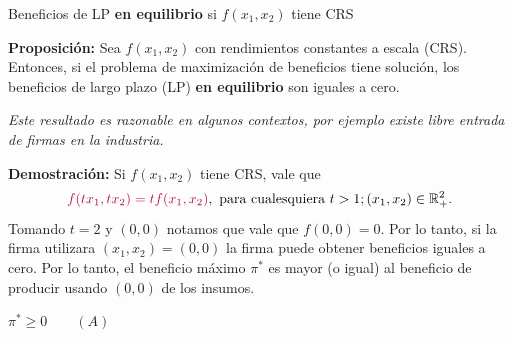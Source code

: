 \documentclass{beamer}
\theoremstyle{definition}
\begin{document}
\begin{frame}{ Beneficios de LP \textbf{en equilibrio} si $f(x_1,x_2)$ tiene CRS}

\color{cyan}\textbf{Proposición:} \color{black} Sea $f(x_1,x_2)$ con rendimientos constantes a escala (CRS). Entonces, si el problema de maximización de beneficios tiene soluci\'on, los beneficios de largo plazo (LP) \textbf{en equilibrio} son iguales a cero.

\textit{Este resultado es razonable en algunos contextos, por ejemplo existe libre entrada de firmas en la industria. }
\medskip

\color{cyan}\textbf{Demostración:} \color{black} Si $f\left( x_1,x_2\right) $ tiene CRS, vale que  \[\color{rosee}f(tx_1,tx_2)=tf(x_1,x_2)\color{black}, \text{ para cualesquiera } t>1; (x_1,x_2)\in \mathbb{R}_{+}^2.\] 
Tomando $t=2$ y $(0,0)$ notamos que vale que $f(0,0)=0$.  Por lo tanto, si la firma utilizara $(x_1,x_2)=(0,0)$ la firma puede obtener beneficios iguales a cero. Por lo tanto, el beneficio máximo $\pi^*$ es mayor (o igual) al beneficio de producir usando $(0,0)$ de los insumos. 
\begin{center}
$\pi ^{\ast }\geq 0 \qquad (A)$
\end{center}

\end{frame}
\end{document}
